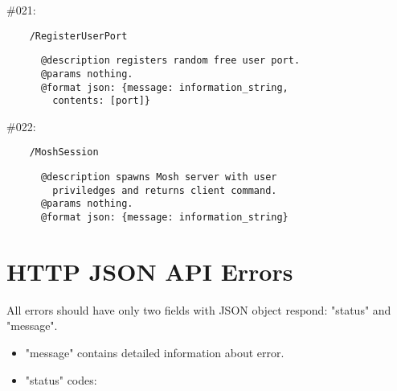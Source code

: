 \documentclass[11pt]{scrartcl}
\begin{document}
\begin{description}
    \item \#021:
      \begin{verbatim}
    /RegisterUserPort
      \end{verbatim}
      \begin{verbatim}
      @description registers random free user port.
      @params nothing.
      @format json: {message: information_string,
        contents: [port]}
      \end{verbatim}

    \item \#022:
      \begin{verbatim}
    /MoshSession
      \end{verbatim}
      \begin{verbatim}
      @description spawns Mosh server with user
        priviledges and returns client command.
      @params nothing.
      @format json: {message: information_string}
      \end{verbatim}


\end{description}

\section{HTTP JSON API Errors}\label{sec:apierrors}
  All errors should have only two fields with JSON object respond: "status" and "message".

  \begin{itemize}
    \item "message" contains detailed information about error.
    \item "status" codes:

  \end{itemize}
\end{document}
